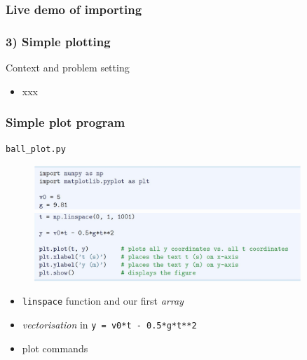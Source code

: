 \documentclass[14pt]{beamer}
\newcommand\red[1]{{\color{red} #1}}
\begin{document}

\begin{frame}[fragile]
\frametitle{Live demo of importing}

\end{frame}


\begin{frame}[fragile]
\frametitle{3) Simple plotting}

Context and problem setting


\begin{itemize}
\item xxx
\end{itemize}

\end{frame}


\begin{frame}[fragile]
\frametitle{Simple plot program}

\vspace*{-6mm}
\begin{center}
{\small
\texttt{ball\_plot.py}
}
\end{center}
\vspace*{-8mm}
\begin{figure}[ht]
	\centering
	\includegraphics[width=0.9\textwidth]{figures/LLp19}
	\includegraphics[width=0.9\textwidth]{figures/LLp20a}
\end{figure}
\vspace*{-8mm}
\begin{itemize}
	\item \texttt{linspace} function and our first \red{\emph{array}}
	\item \red{\emph{vectorisation}} in \texttt{y = v0*t - 0.5*g*t**2}
	\item plot commands
\end{itemize}

\end{frame}
\end{document}
